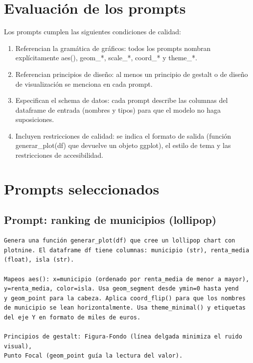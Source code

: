 \documentclass[spanish,a4paper,12pt,oneside]{extreport}
\begin{document}
\section*{Evaluación de los prompts}

Los prompts cumplen las siguientes condiciones de calidad:

\begin{enumerate}
  \item Referencian la gramática de gráficos: todos los prompts nombran explícitamente aes(), geom\_*, scale\_*, coord\_* y theme\_*.
  \item Referencian principios de diseño: al menos un principio de gestalt o de diseño de visualización se menciona en cada prompt.
  \item Especifican el schema de datos: cada prompt describe las columnas del dataframe de entrada (nombres y tipos) para que el modelo no haga suposiciones.
  \item Incluyen restricciones de calidad: se indica el formato de salida (función generar\_plot(df) que devuelve un objeto ggplot), el estilo de tema y las restricciones de accesibilidad.
\end{enumerate}

\section*{Prompts seleccionados}

\subsection*{Prompt: ranking de municipios (lollipop)}

\begin{lstlisting}[language={},caption={Prompt para el lollipop de ranking.}]
Genera una función generar_plot(df) que cree un lollipop chart con
plotnine. El dataframe df tiene columnas: municipio (str), renta_media
(float), isla (str).

Mapeos aes(): x=municipio (ordenado por renta_media de menor a mayor),
y=renta_media, color=isla. Usa geom_segment desde ymin=0 hasta yend
y geom_point para la cabeza. Aplica coord_flip() para que los nombres
de municipio se lean horizontalmente. Usa theme_minimal() y etiquetas
del eje Y en formato de miles de euros.

Principios de gestalt: Figura-Fondo (línea delgada minimiza el ruido visual),
Punto Focal (geom_point guía la lectura del valor).
\end{lstlisting}
\end{document}
